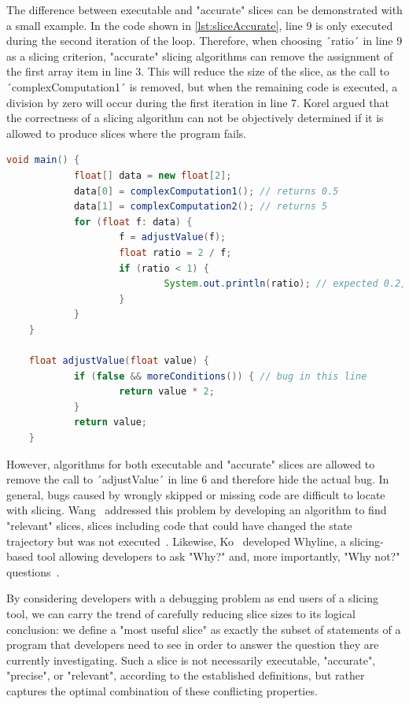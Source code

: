 The difference between executable and "accurate" slices can be demonstrated with a small example.
In the code shown in \cref{lst:sliceAccurate}, line 9 is only executed during the second iteration of the loop.
Therefore, when choosing ´ratio´ in line 9 as a slicing criterion, "accurate" slicing algorithms can remove the assignment of the first array item in line 3.
This will reduce the size of the slice, as the call to ´complexComputation1´ is removed, but when the remaining code is executed, a division by zero will occur during the first iteration in line 7.
Korel argued that the correctness of a slicing algorithm can not be objectively determined if it is allowed to produce slices where the program fails.

\begin{lstlisting}[float,caption={Code example for accurate slices.},stepnumber=2,numberfirstline=false,label=lst:sliceAccurate,language=Java]
	void main() {
			float[] data = new float[2];
			data[0] = complexComputation1(); // returns 0.5
			data[1] = complexComputation2(); // returns 5
			for (float f: data) {
					f = adjustValue(f);
					float ratio = 2 / f;
					if (ratio < 1) {
							System.out.println(ratio); // expected 0.2, got 0.4
					}
			}
	}

	float adjustValue(float value) {
			if (false && moreConditions()) { // bug in this line
					return value * 2;
			}
			return value;
	}
\end{lstlisting}

However, algorithms for both executable and "accurate" slices are allowed to remove the call to ´adjustValue´ in line 6 and therefore hide the actual bug.
In general, bugs caused by wrongly skipped or missing code are difficult to locate with slicing.
Wang \etal\ addressed this problem by developing an algorithm to find "relevant" slices, slices including code that could have changed the state trajectory but was not executed~\cite{wang08:dynamic_slicing_on_java}.
Likewise, Ko \etal\ developed Whyline, a slicing-based tool allowing developers to ask "Why?" and, more importantly, "Why not?" questions~\cite{ko08:debugging_reinvented_asking}.

By considering developers with a debugging problem as end users of a slicing tool, we can carry the trend of carefully reducing slice sizes to its logical conclusion: we define a "most useful slice" as exactly the subset of statements of a program that developers need to see in order to answer the question they are currently investigating.
Such a slice is not necessarily executable, "accurate", "precise", or "relevant", according to the established definitions, but rather captures the optimal combination of these conflicting properties.


